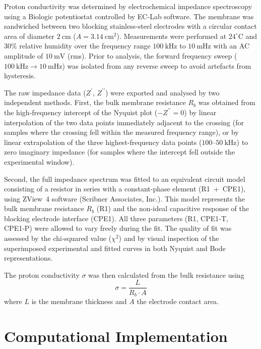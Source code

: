 \documentclass[12pt,a4paper]{report}
\begin{document}
Proton conductivity was determined by electrochemical impedance spectroscopy 
using a Biologic potentiostat controlled by EC‑Lab software. The membrane 
was sandwiched between two blocking stainless‑steel electrodes with a 
circular contact area of diameter $2\ \text{cm}$ ($A = 3.14\ \text{cm}^2$). 
Measurements were performed at $24^{\circ}\text{C}$ and $30\%$ relative 
humidity over the frequency range $100\ \text{kHz}$ to $10\ \text{mHz}$ with 
an AC amplitude of $10\ \text{mV}$ (rms). Prior to analysis, the forward 
frequency sweep ($100\ \text{kHz}\rightarrow 10\ \text{mHz}$) was isolated 
from any reverse sweep to avoid artefacts from hysteresis.

The raw impedance data ($Z^{\prime}$, $Z^{\prime\prime}$) were exported and 
analysed by two independent methods. First, the bulk membrane resistance 
$R_{b}$ was obtained from the high‑frequency intercept of the Nyquist plot 
($-Z^{\prime\prime}=0$) by linear interpolation of the two data points 
immediately adjacent to the crossing (for samples where the crossing fell 
within the measured frequency range), or by linear extrapolation of the 
three highest‑frequency data points ($100$--$50\ \text{kHz}$) to zero 
imaginary impedance (for samples where the intercept fell outside the 
experimental window).

Second, the full impedance spectrum was fitted to an equivalent circuit 
model consisting of a resistor in series with a constant‑phase element 
(R1~+~CPE1), using ZView~4 software (Scribner Associates, Inc.). 
This model represents the bulk membrane resistance $R_b$ (R1) and the 
non‑ideal capacitive response of the blocking electrode interface (CPE1). 
All three parameters (R1, CPE1‑T, CPE1‑P) were allowed to vary freely 
during the fit. The quality of fit was assessed by the chi‑squared value 
($\chi^{2}$) and by visual inspection of the superimposed experimental 
and fitted curves in both Nyquist and Bode representations.

The proton conductivity $\sigma$ was then calculated from the bulk 
resistance using
\begin{equation}
\sigma = \frac{L}{R_b \cdot A}
\label{eq:conductivity}
\end{equation}
where $L$ is the membrane thickness and $A$ the electrode contact area.

\section{Computational Implementation}
\end{document}
